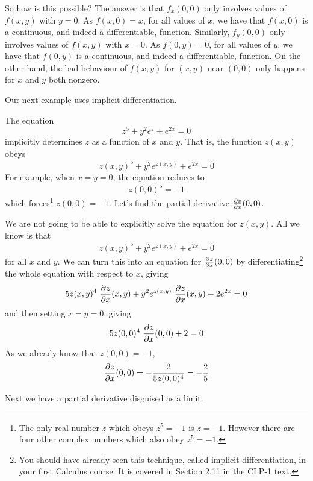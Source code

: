 \begin{eg}
So how is this possible? The answer is that $f_x(0,0)$ only involves values of $f(x,y)$ with $y=0$. As $f(x,0)=x$, for all values of $x$, we have that
$f(x,0)$ is a continuous, and indeed a differentiable, function. Similarly, 
$f_y(0,0)$ only involves values of $f(x,y)$ with $x=0$. As $f(0,y)=0$, for all values of $y$, we have that $f(0,y)$ is a continuous, and indeed a 
differentiable, function. On the other hand, the bad behaviour of $f(x,y)$ for $(x,y)$ near
$(0,0)$ only happens for $x$ and $y$ both nonzero.

\end{eg}
Our next example uses implicit differentiation.
\begin{eg}\label{eg partials E}
The equation 
\begin{equation*}
z^5 + y^2 e^z +e^{2x}=0
\end{equation*}
implicitly determines $z$ as a function of $x$ and $y$. 
That is, the function $z(x,y)$ obeys
\begin{equation*}
z(x,y)^5 + y^2 e^{z(x,y)} +e^{2x}=0
\end{equation*}
For example, when $x=y=0$, the equation reduces to
\begin{equation*}
z(0,0)^5=-1
\end{equation*}
which forces\footnote{The only real number $z$ which obeys $z^5=-1$
is $z=-1$. However there are four other complex numbers which also obey
$z^5=-1$.} $z(0,0)=-1$. Let's find the partial derivative $\pdiff{z}{x}(0,0)$.

We are not going to be able to explicitly solve the equation for $z(x,y)$.
All we know is that
\begin{equation*}
z(x,y)^5 + y^2 e^{z(x,y)} + e^{2x} =0
\end{equation*}
for all $x$ and $y$. We can turn this into an equation for $\pdiff{z}{x}(0,0)$
by differentiating\footnote{You should have already seen this technique,
called implicit differentiation, in your first Calculus course. It is covered 
in Section 2.11 in the CLP-1 text.} the whole equation with respect to $x$, 
giving
\begin{equation*}
5z(x,y)^4\ \pdiff{z}{x}(x,y) + y^2 e^{z(x,y)}\ \pdiff{z}{x}(x,y) +2e^{2x}  =0
\end{equation*}
and then setting $x=y=0$, giving
\begin{equation*}
5z(0,0)^4\ \pdiff{z}{x}(0,0) +2  =0
\end{equation*}
As we already know that $z(0,0)=-1$,
\begin{equation*}
\pdiff{z}{x}(0,0) = -\frac{2}{5z(0,0)^4} =-\frac{2}{5}
\end{equation*}
\end{eg}
Next we have a partial derivative disguised as a limit.

